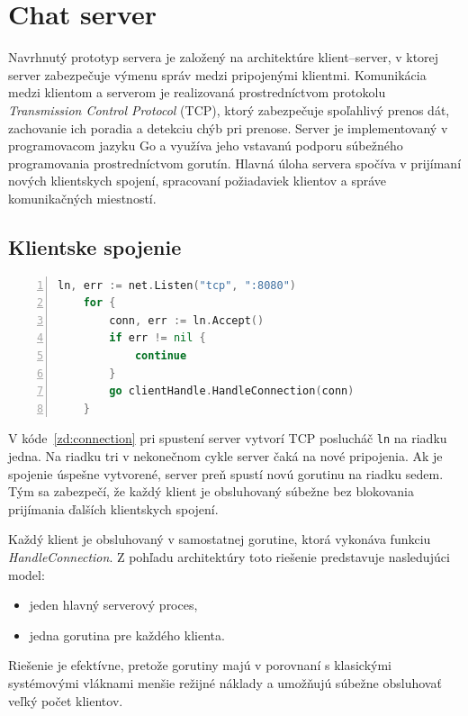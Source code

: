 \documentclass[
  biblatex,
  seconds=true,
  language=slovak,
  figures=false,
  urldate=iso,
  glossaries,
  index
]{kidiplom}
\begin{document}
\renewcommand{\lstlistingname}{Zdrojový kód}
\newpage
\section{Chat server}

Navrhnutý prototyp servera je založený na architektúre klient--server, v ktorej server zabezpečuje výmenu správ medzi pripojenými klientmi. Komunikácia medzi klientom a serverom je realizovaná prostredníctvom protokolu \textit{Transmission Control Protocol} (TCP), ktorý zabezpečuje spoľahlivý prenos dát, zachovanie ich poradia a detekciu chýb pri prenose. Server je implementovaný v programovacom jazyku Go a využíva jeho vstavanú podporu súbežného programovania prostredníctvom gorutín. Hlavná úloha servera spočíva v prijímaní nových klientskych spojení, spracovaní požiadaviek klientov a správe komunikačných miestností.

\subsection{Klientske spojenie}

\begin{lstlisting}[language=Go, numbers=left, caption={Klientské spojenie}, captionpos=b, label={zd:connection}]
	ln, err := net.Listen("tcp", ":8080")
	for {
		conn, err := ln.Accept()
		if err != nil {
			continue
		}
		go clientHandle.HandleConnection(conn)
	}
\end{lstlisting}

V kóde~\ref{zd:connection} pri spustení server vytvorí TCP poslucháč \texttt{ln} na riadku jedna. Na riadku tri v nekonečnom cykle server čaká na nové pripojenia. Ak je spojenie úspešne vytvorené, server preň spustí novú gorutinu na riadku sedem. Tým sa zabezpečí, že každý klient je obsluhovaný súbežne bez blokovania prijímania ďalších klientskych spojení.

Každý klient je obsluhovaný v samostatnej gorutine, ktorá vykonáva funkciu \emph{HandleConnection}. Z pohľadu architektúry toto riešenie predstavuje nasledujúci model:

\begin{itemize}
	\item jeden hlavný serverový proces,
	\item jedna gorutina pre každého klienta.
\end{itemize}

Riešenie je efektívne, pretože gorutiny majú v porovnaní s klasickými systémovými vláknami menšie režijné náklady a umožňujú súbežne obsluhovať veľký počet klientov.
\end{document}
